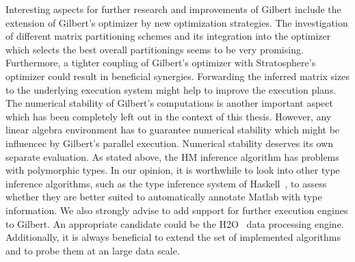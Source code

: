 Interesting aspects for further research and improvements of Gilbert include the extension of Gilbert's optimizer by new optimization strategies.
The investigation of different matrix partitioning schemes and its integration into the optimizer which selects the best overall partitionings seems to be very promising.
Furthermore, a tighter coupling of Gilbert's optimizer with Stratosphere's optimizer could result in beneficial synergies.
Forwarding the inferred matrix sizes to the underlying execution system might help to improve the execution plans.
The numerical stability of Gilbert's computations is another important aspect which has been completely left out in the context of this thesis.
However, any linear algebra environment has to guarantee numerical stability which might be influencec by Gilbert's parallel execution.
Numerical stability deserves its own separate evaluation.
As stated above, the HM inference algorithm has problems with polymorphic types.
In our opinion, it is worthwhile to look into other type inference algorithms, such as the type inference system of Haskell~\cite{haskell}, to assess whether they are better suited to automatically annotate Matlab with type information.
We also strongly advise to add support for further execution engines to Gilbert.
An appropriate candidate could be the H2O~\cite{h2o} data processing engine.
Additionally, it is always beneficial to extend the set of implemented algorithms and to probe them at an large data scale.
